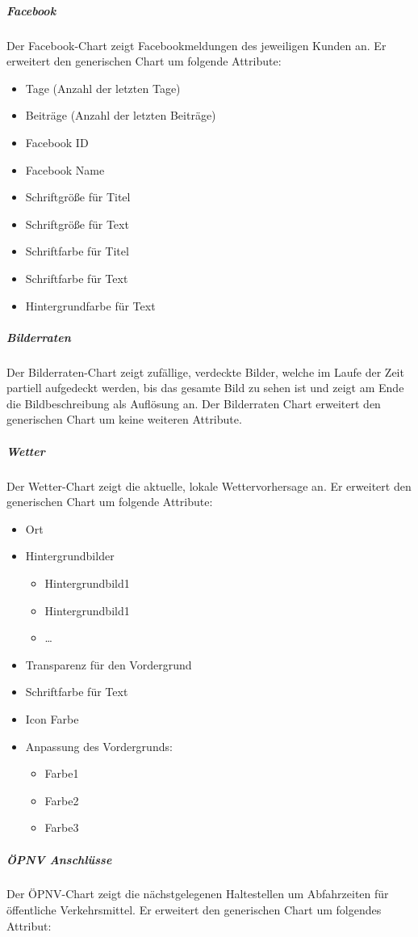 \documentclass[a4paper]{article}
\begin{document}
	\subparagraph{Facebook}
	Der Facebook-Chart zeigt Facebookmeldungen des jeweiligen Kunden an.
	Er erweitert den generischen Chart um folgende Attribute:
	\begin{itemize}
	\item Tage (Anzahl der letzten Tage)
	\item Beiträge (Anzahl der letzten Beiträge)
	\item Facebook ID
	\item Facebook Name
	\item Schriftgröße für Titel
	\item Schriftgröße für Text
	\item Schriftfarbe für Titel
	\item Schriftfarbe für Text
	\item Hintergrundfarbe für Text
	\end{itemize}
	\subparagraph{Bilderraten}
	Der Bilderraten-Chart zeigt zufällige, verdeckte Bilder, welche im Laufe der Zeit partiell aufgedeckt werden, bis das gesamte Bild zu sehen ist und zeigt am Ende die Bildbeschreibung als Auflösung an.
	Der Bilderraten Chart erweitert den generischen Chart um keine weiteren Attribute.
	\pagebreak
	\subparagraph{Wetter}
	Der Wetter-Chart zeigt die aktuelle, lokale Wettervorhersage an.
	Er erweitert den generischen Chart um folgende Attribute:
	\begin{itemize}
	\item Ort
	\item Hintergrundbilder
		\begin{itemize}
		\item Hintergrundbild1
		\item Hintergrundbild1
		\item …
		\end{itemize}
	\item Transparenz für den Vordergrund
	\item Schriftfarbe für Text
	\item Icon Farbe
	\item Anpassung des Vordergrunds:
		\begin{itemize}
		\item Farbe1
		\item Farbe2
		\item Farbe3
		\end{itemize}
	\end{itemize}
	\subparagraph{ÖPNV Anschlüsse}
	Der ÖPNV-Chart zeigt die nächstgelegenen Haltestellen um Abfahrzeiten für öffentliche Verkehrsmittel.
	Er erweitert den generischen Chart um folgendes Attribut:
\end{document}
